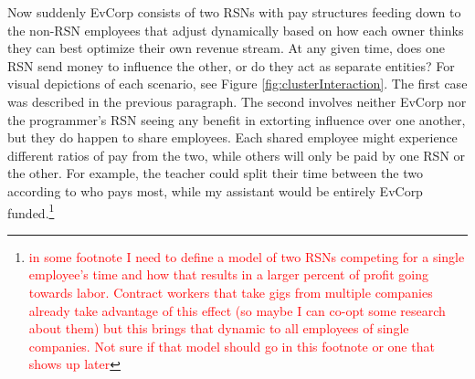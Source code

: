 \documentclass{article}[10pt]
\begin{document}
Now suddenly EvCorp consists of two RSNs with pay structures feeding down to the non-RSN employees that adjust dynamically based on how each owner thinks they can best optimize their own revenue stream.
At any given time, does one RSN send money to influence the other, or do they act as separate entities?
For visual depictions of each scenario, see Figure \ref{fig:clusterInteraction}.
The first case was described in the previous paragraph.
The second involves neither EvCorp nor the programmer's RSN seeing any benefit in extorting influence over one another, but they do happen to share employees.
Each shared employee might experience different ratios of pay from the two, while others will only be paid by one RSN or the other.
For example, the teacher could split their time between the two according to who pays most, while my assistant would be entirely EvCorp funded.\footnote{
    \textcolor{red}{in some footnote I need to define a model of two RSNs competing for a single employee's time and how that results in a larger percent of profit going towards labor. 
    Contract workers that take gigs from multiple companies already take advantage of this effect (so maybe I can co-opt some research about them) but this brings that dynamic to all employees of single companies.
    Not sure if that model should go in this footnote or one that shows up later}}\par
\end{document}
